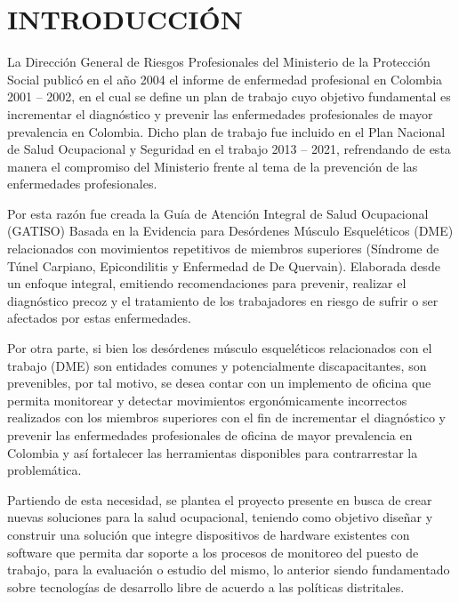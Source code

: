 \newpage
\chapter{INTRODUCCIÓN} 
La Dirección General de Riesgos Profesionales del Ministerio de la Protección Social publicó en el año 2004 el informe de enfermedad profesional en Colombia 2001 – 2002, en el cual se define un plan de trabajo cuyo objetivo fundamental es incrementar el diagnóstico y prevenir las enfermedades profesionales de mayor prevalencia en Colombia. Dicho plan de trabajo fue incluido en el Plan Nacional de Salud Ocupacional y Seguridad en el trabajo 2013 – 2021, refrendando de esta manera el compromiso del Ministerio frente al tema de la prevención de las enfermedades profesionales.

Por esta razón fue creada la Guía de Atención Integral de Salud Ocupacional (GATISO) Basada en la Evidencia para Desórdenes Músculo Esqueléticos (DME) relacionados con movimientos repetitivos de miembros superiores (Síndrome de Túnel Carpiano, Epicondilitis y Enfermedad de De Quervain). Elaborada desde un enfoque integral, emitiendo recomendaciones para prevenir, realizar el diagnóstico precoz y el tratamiento de los trabajadores en riesgo de sufrir o ser afectados por estas enfermedades.

Por otra parte, si bien los desórdenes músculo esqueléticos relacionados con el trabajo (DME) son entidades comunes y potencialmente discapacitantes, son prevenibles, por tal motivo, se desea contar con un implemento de oficina que permita monitorear y detectar movimientos ergonómicamente incorrectos realizados con los miembros superiores con el fin de incrementar el diagnóstico y prevenir las enfermedades profesionales de oficina de mayor prevalencia en Colombia y así fortalecer las herramientas disponibles para contrarrestar la problemática.

Partiendo de esta necesidad, se plantea el proyecto presente en busca de crear nuevas soluciones para la salud ocupacional, teniendo como objetivo diseñar y construir una solución que integre dispositivos de hardware existentes con software que permita dar soporte a los procesos de monitoreo del puesto de trabajo, para la evaluación o estudio del mismo, lo anterior siendo fundamentado sobre tecnologías de desarrollo libre de acuerdo a las políticas distritales.